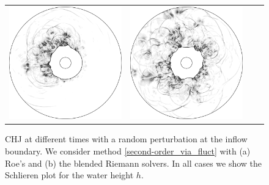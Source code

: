 \documentclass[preprint, 11pt]{article}
\begin{document}
\begin{figure}[!h]
{\begin{tabular}{cccc}
      \includegraphics[scale=0.24]{figures/chj_r2wp_blended_t4p0.png} &
      \includegraphics[scale=0.24]{figures/chj_r2wp_blended_t5p0.png}
    \end{tabular}
  }
  \caption{CHJ at different times with a random perturbation at the inflow boundary.
    We consider method \eqref{second-order_via_fluct} with (a) Roe's and (b) the blended
    Riemann solvers. In all cases we show the Schlieren plot for the water height $h$.}
\end{figure}
    
\end{document}
